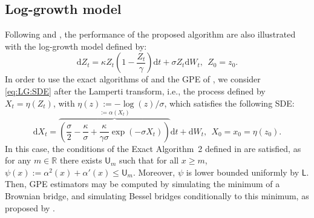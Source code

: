 \documentclass[12pt]{article}
\newcommand{\rmd}{\mathrm{d}}
\newcommand{\eqsp}{\;}
\newcommand{\1}{\mathrm{1}}
\begin{document}
%
\subsection*{Log-growth model}
Following \cite{beskos:papaspiliopoulos:roberts:fearnhead:2006} and \cite{olsson:westerborn:2016}, the performance of the proposed algorithm are also illustrated with the log-growth model defined by:
\begin{equation}
\rmd Z_t = \kappa Z_t\left(1-\frac{Z_t}{\gamma}\right)\rmd t + \sigma Z_t \rmd W_t,~~Z_0=z_0. \label{eq:LG:SDE}
\end{equation}
In order to use the exact algorithms of \cite{beskos:papaspiliopoulos:roberts:fearnhead:2006} and the GPE of \cite{fearnhead:papaspiliopoulos:roberts:2008}, we consider  \eqref{eq:LG:SDE} after the Lamperti transform, i.e., the process defined by $X_t=\eta(Z_t)$, with $\eta(z) := -\log (z)/\sigma$,  which satisfies the following SDE:
\begin{equation}
\rmd X_t = \overbrace{\left( \frac{\sigma}{2} -  \frac{\kappa}{\sigma} + \frac{\kappa}{\gamma\sigma}\exp\left(-\sigma X_t\right)\right)}^{:=\alpha(X_t)}\rmd t +\rmd W_t,~~X_0=x_0=\eta(z_0).\label{eq:Lamp:LG}
\end{equation}
In this case, the conditions of the Exact Algorithm~2 defined in \cite{beskos:papaspiliopoulos:roberts:fearnhead:2006} are satisfied, as for any $m \in \mathbb{R}$ there exists $\mathsf{U}_m$ such that for all $x\ge m$, $\psi(x):=\alpha^2(x)+\alpha'(x) \leq \mathsf{U}_m$. Moreover, $\psi$ is lower bounded uniformly by  $\mathsf{L}$.  Then, GPE estimators may be computed by simulating the minimum of a Brownian bridge, and simulating Bessel bridges conditionally to this minimum, as proposed by \cite{beskos:papaspiliopoulos:roberts:fearnhead:2006}.
\end{document}

